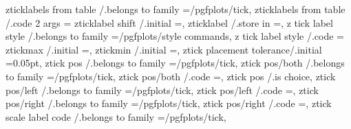 {{{{zticklabels from table   /.belongs to family                                                                                            =/pgfplots/tick,
zticklabels from table   /.code 2 args                                                                                                  ={%
zticklabel shift         /.initial                                                                                                      =,
zticklabel               /.store in                                                                                                     =\pgfplots@zticklabel,
z tick label style       /.belongs to family                                                                                            =/pgfplots/style commands,
z tick label style       /.code                                                                                                         ={%
ztickmax                 /.initial                                                                                                      =,
ztickmin                 /.initial                                                                                                      =,
ztick placement tolerance/.initial                                                                                                      =0.05pt,
ztick pos                /.belongs to family                                                                                            =/pgfplots/tick,
ztick pos/both           /.belongs to family                                                                                            =/pgfplots/tick,
ztick pos/both           /.code                                                                                                         ={\def\pgfplots@ztickposnum{0}},
ztick pos                /.is choice,                                                                                             
ztick pos/left           /.belongs to family                                                                                            =/pgfplots/tick,
ztick pos/left           /.code                                                                                                         ={\def\pgfplots@ztickposnum{1}},
ztick pos/right          /.belongs to family                                                                                            =/pgfplots/tick,
ztick pos/right          /.code                                                                                                         ={\def\pgfplots@ztickposnum{3}},
ztick scale label code   /.belongs to family                                                                                            =/pgfplots/tick,
}}}}}}

